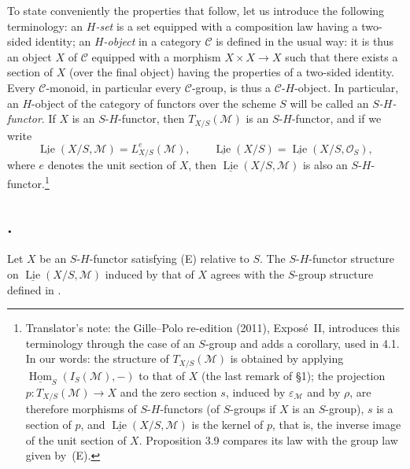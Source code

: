 %
To state conveniently the properties that follow, let us introduce the
following terminology: an \emph{\(H\)-set} is a set equipped with a
composition law having a two-sided identity; an \emph{\(H\)-object} in a
category \(\mathscr C\) is defined in the usual way: it is thus an object
\(X\) of \(\mathscr C\) equipped with a morphism \(X\times X\to X\) such
that there exists a section of \(X\) (over the final object) having the
properties of a two-sided identity. Every \(\mathscr C\)-monoid, in
particular every \(\mathscr C\)-group, is thus a
\(\mathscr C\)-\(H\)-object. In particular, an \(H\)-object of the category
of functors over the scheme \(S\) will be called an
\emph{\(S\)-\(H\)-functor}. If \(X\) is an \(S\)-\(H\)-functor, then
\(T_{X/S}(\mathcal M)\) is an \(S\)-\(H\)-functor, and if we write
\[
  \underline{\operatorname{Lie}}(X/S,\mathcal M)=L^e_{X/S}(\mathcal M),
  \qquad
  \underline{\operatorname{Lie}}(X/S)
  =\underline{\operatorname{Lie}}(X/S,\mathcal O_S),
\]
where \(e\) denotes the unit section of \(X\), then
\(\underline{\operatorname{Lie}}(X/S,\mathcal M)\) is also an
\(S\)-\(H\)-functor.\footnote{Translator's note: the Gille--Polo re-edition
(2011), Expos\'e~II, introduces this terminology through the case of an
\(S\)-group and adds a corollary, used in 4.1. In our words: the structure
of \(T_{X/S}(\mathcal M)\) is obtained by applying
\(\underline{\operatorname{Hom}}_S(I_S(\mathcal M),-)\) to that of \(X\)
(the last remark of \S1); the projection \(p\colon T_{X/S}(\mathcal M)\to X\)
and the zero section \(s\), induced by \(\varepsilon_{\mathcal M}\) and by
\(\rho\), are therefore morphisms of \(S\)-\(H\)-functors (of \(S\)-groups if
\(X\) is an \(S\)-group), \(s\) is a section of \(p\), and
\(\underline{\operatorname{Lie}}(X/S,\mathcal M)\) is the kernel of \(p\),
that is, the inverse image of the unit section of \(X\). Proposition 3.9
compares its law with the group law given by~(E).}

\subsection*{.}
Let \(X\) be an \(S\)-\(H\)-functor satisfying (E) relative to \(S\).
The \(S\)-\(H\)-functor structure on
\(\underline{\operatorname{Lie}}(X/S,\mathcal M)\) induced by that of
\(X\) agrees with the \(S\)-group structure defined in .

